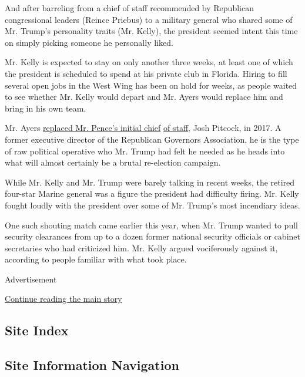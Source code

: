 And after barreling from a chief of staff recommended by Republican
congressional leaders (Reince Priebus) to a military general who shared
some of Mr. Trump's personality traits (Mr. Kelly), the president seemed
intent this time on simply picking someone he personally liked.

Mr. Kelly is expected to stay on only another three weeks, at least one
of which the president is scheduled to spend at his private club in
Florida. Hiring to fill several open jobs in the West Wing has been on
hold for weeks, as people waited to see whether Mr. Kelly would depart
and Mr. Ayers would replace him and bring in his own team.

Mr. Ayers
\href{https://www.nytimes.com/2017/06/29/us/politics/mike-pence-josh-pitcock-chief-of-staff.html}{replaced
Mr. Pence's initial chief}
\href{https://www.nytimes.com/2017/06/29/us/politics/mike-pence-josh-pitcock-chief-of-staff.html}{of
staff}, Josh Pitcock, in 2017. A former executive director of the
Republican Governors Association, he is the type of raw political
operative who Mr. Trump had felt he needed as he heads into what will
almost certainly be a brutal re-election campaign.

While Mr. Kelly and Mr. Trump were barely talking in recent weeks, the
retired four-star Marine general was a figure the president had
difficulty firing. Mr. Kelly fought loudly with the president over some
of Mr. Trump's most incendiary ideas.

One such shouting match came earlier this year, when Mr. Trump wanted to
pull security clearances from up to a dozen former national security
officials or cabinet secretaries who had criticized him. Mr. Kelly
argued vociferously against it, according to people familiar with what
took place.

Advertisement

\protect\hyperlink{after-bottom}{Continue reading the main story}

\hypertarget{site-index}{%
\subsection{Site Index}\label{site-index}}

\hypertarget{site-information-navigation}{%
\subsection{Site Information
Navigation}\label{site-information-navigation}}

